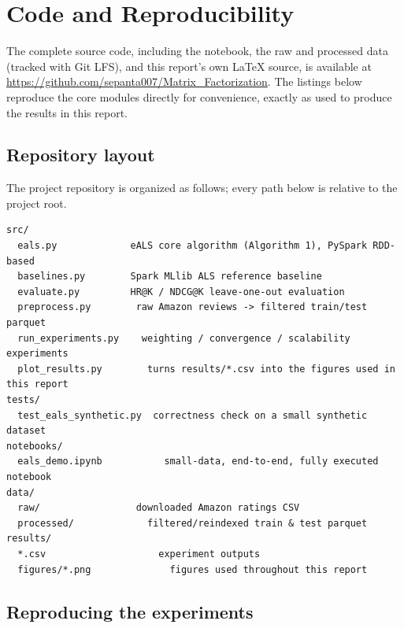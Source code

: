 \chapter{Code and Reproducibility}
\label{app:code}

The complete source code, including the notebook, the raw and processed
data (tracked with Git LFS), and this report's own \LaTeX{} source, is
available at
\url{https://github.com/sepanta007/Matrix_Factorization}. The listings
below reproduce the core modules directly for convenience, exactly as used
to produce the results in this report.

\section{Repository layout}

The project repository is organized as follows; every path below is
relative to the project root.

\begin{lstlisting}[style=plaintext, caption={Repository layout.}]
src/
  eals.py             eALS core algorithm (Algorithm 1), PySpark RDD-based
  baselines.py        Spark MLlib ALS reference baseline
  evaluate.py         HR@K / NDCG@K leave-one-out evaluation
  preprocess.py        raw Amazon reviews -> filtered train/test parquet
  run_experiments.py    weighting / convergence / scalability experiments
  plot_results.py        turns results/*.csv into the figures used in this report
tests/
  test_eals_synthetic.py  correctness check on a small synthetic dataset
notebooks/
  eals_demo.ipynb           small-data, end-to-end, fully executed notebook
data/
  raw/                 downloaded Amazon ratings CSV
  processed/             filtered/reindexed train & test parquet
results/
  *.csv                    experiment outputs
  figures/*.png              figures used throughout this report
\end{lstlisting}

\section{Reproducing the experiments}

